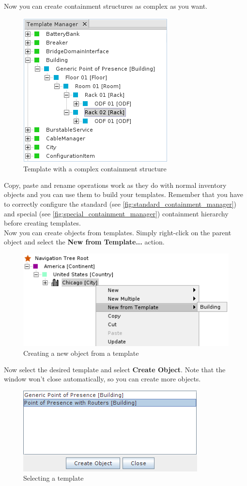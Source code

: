\documentclass[a4paper]{article}
\begin{document}
	Now you can create containment structures as complex as you want.\\
	
	\begin{figure}[h!]
		\centering
		\includegraphics[width=0.4\linewidth]{img/template_manager_template_containment.png}
		\caption{Template with a complex containment structure}
		\label{fig:template_manager_template_containment}
	\end{figure}
	Copy, paste and rename operations work as they do with normal inventory objects and you can use them to build your templates. Remember that you have to correctly configure the standard (see \ref{fig:standard_containment_manager}) and special (see \ref{fig:special_containment_manager}) containment hierarchy before creating templates.\\
	Now you can create objects from templates. Simply right-click on the parent object and select the \textbf{New from Template...} action.\\
	\begin{figure}[h!]
		\centering
		\includegraphics[width=0.6\linewidth]{img/template_manager_new_from_template.png}
		\caption{Creating a new object from a template}
		\label{fig:template_manager_new_from_template}
	\end{figure}
	
	\newpage
	Now select the desired template and select \textbf{Create Object}. Note that the window won't close automatically, so you can create more objects.
	\begin{figure}[h!]
		\centering
		\includegraphics[width=0.5\linewidth]{img/template_manager_select_template.png}
		\caption{Selecting a template}
		\label{fig:template_manager_select_template}
	\end{figure}
\end{document}
